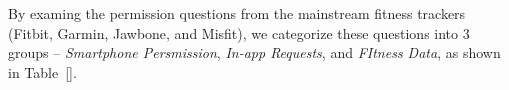 By examing the permission questions from the mainstream fitness trackers (Fitbit, Garmin, Jawbone, and Misfit), we categorize these questions into 3 groups -- \textit{Smartphone Persmission}, \textit{In-app Requests}, and \textit{FItness Data}, as shown in Table~\ref{}. 

%	
%	
%		
